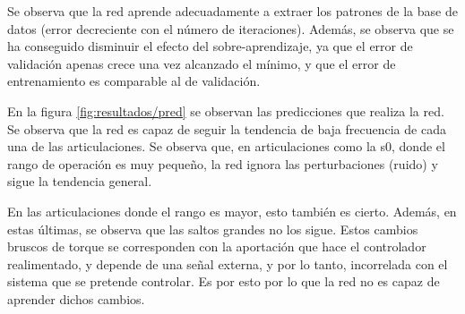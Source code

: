 Se observa que la red aprende adecuadamente a extraer los patrones de la base de datos (error decreciente con el número de iteraciones). Además, se observa que se ha conseguido disminuir el efecto del sobre-aprendizaje, ya que el error de validación apenas crece una vez alcanzado el mínimo, y que el error de entrenamiento es comparable al de validación.


En la figura \ref{fig:resultados/pred} se observan las predicciones que realiza la red. Se observa que la red es capaz de seguir la tendencia de baja frecuencia de cada una de las articulaciones. Se observa que, en articulaciones como la s0, donde el rango de operación es muy pequeño, la red ignora las perturbaciones (ruido) y sigue la tendencia general.


En las articulaciones donde el rango es mayor, esto también es cierto. Además, en estas últimas, se observa que las saltos grandes no los sigue. Estos cambios bruscos de torque se corresponden con la aportación que hace el controlador realimentado, y depende de una señal externa, y por lo tanto, incorrelada con el sistema que se pretende controlar. Es por esto por lo que la red no es capaz de aprender dichos cambios.

